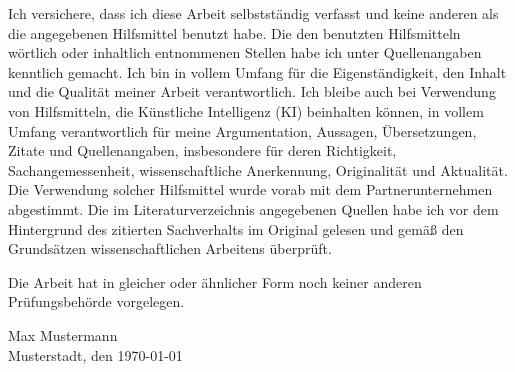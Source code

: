 \begin{declaration-of-authorship}
    Ich versichere, dass ich diese Arbeit selbstständig verfasst und keine anderen als
    die angegebenen Hilfsmittel benutzt habe. Die den benutzten Hilfsmitteln wörtlich
    oder inhaltlich entnommenen Stellen habe ich unter Quellenangaben kenntlich gemacht. Ich bin in vollem Umfang für die Eigenständigkeit, den Inhalt und die Qualität
    meiner Arbeit verantwortlich. Ich bleibe auch bei Verwendung von Hilfsmitteln, die
    Künstliche Intelligenz (KI) beinhalten können, in vollem Umfang verantwortlich für
    meine Argumentation, Aussagen, Übersetzungen, Zitate und Quellenangaben, insbesondere für deren Richtigkeit, Sachangemessenheit, wissenschaftliche Anerkennung, Originalität und Aktualität. Die Verwendung solcher Hilfsmittel wurde vorab
    mit dem Partnerunternehmen abgestimmt. Die im Literaturverzeichnis angegebenen Quellen habe ich vor dem Hintergrund des zitierten Sachverhalts im Original
    gelesen und gemäß den Grundsätzen wissenschaftlichen Arbeitens überprüft.
    
    Die Arbeit hat in gleicher oder ähnlicher Form noch keiner anderen Prüfungsbehörde vorgelegen.

    \vspace{4em}
    \noindent Max Mustermann\\
    Musterstadt, den \today
\end{declaration-of-authorship}